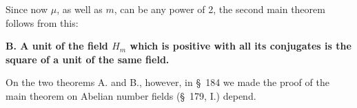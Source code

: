 \documentclass[11pt]{article}
\begin{document}
Since now $\mu$, as well as $m$, can be any power of 2, the second main theorem follows from this:

\begin{center}\textbf{B. A unit of the field $H_m$ which is positive with all its conjugates is the square of a unit of the same field.}\end{center}

On the two theorems A. and B., however, in \S~184 we made the proof of the main theorem on Abelian number fields (\S~179, I.) depend.
\end{document}
